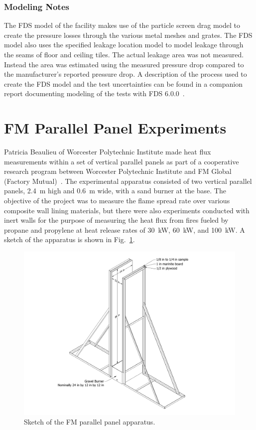 \subsubsection{Modeling Notes}

The FDS model of the facility makes use of the particle screen drag model to create the pressure losses through the various metal meshes and grates. The FDS model also uses the specified leakage location model to model leakage through the seams of floor and ceiling tiles. The actual leakage area was not measured. Instead the area was estimated using the measured pressure drop compared to the manufacturer's reported pressure drop. A description of the process used to create the FDS model and the test uncertainties can be found in a companion report documenting modeling of the tests with FDS 6.0.0~\cite{FDS_Datacenter_Rpt}.


\section{FM Parallel Panel Experiments}
\label{FM_Parallel_Panel_Description}

Patricia Beaulieu of Worcester Polytechnic Institute made heat flux measurements within a set of vertical parallel panels as part of a cooperative research program between Worcester Polytechnic Institute and FM Global (Factory Mutual)~\cite{Beaulieu:FM}. The experimental apparatus consisted of two vertical parallel panels, 2.4~m high and 0.6~m wide, with a sand burner at the base. The objective of the project was to measure the flame spread rate over various composite wall lining materials, but there were also experiments conducted with inert walls for the purpose of measuring the heat flux from fires fueled by propane and propylene at heat release rates of 30~kW, 60~kW, and 100~kW. A sketch of the apparatus is shown in Fig.~\ref{Parallel_Panel_Sketch}.

\begin{figure}[!ht]
\includegraphics[width=\textwidth]{FIGURES/FM_Parallel_Panel/Full_Assembly}
\caption[Sketch of the FM parallel panel apparatus]{Sketch of the FM parallel panel apparatus.}
\label{Parallel_Panel_Sketch}
\end{figure}



